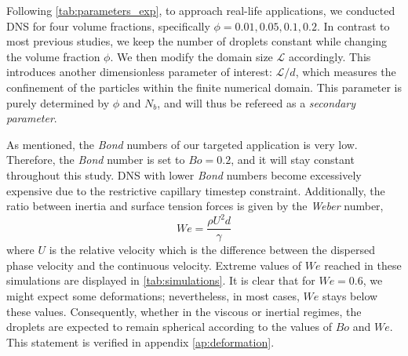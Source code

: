 Following \ref{tab:parameters_exp}, to approach real-life applications, we conducted DNS for four volume fractions, specifically $\phi = 0.01,0.05,0.1,0.2$.
In contrast to most previous studies, we keep the number of droplets constant while changing the volume fraction $\phi$. 
We then modify the domain size $\mathcal{L}$ accordingly. 
This introduces another dimensionless parameter of interest: $\mathcal{L}/d$, which measures the confinement of the particles within the finite numerical domain. 
This parameter is purely determined by $\phi$ and $N_b$, and will thus be refereed as a \textit{secondary parameter}.

As mentioned, the \textit{Bond} numbers of our targeted application is very low.
Therefore, the \textit{Bond} number is set to $Bo = 0.2$, and it will stay constant throughout this study.
DNS with lower \textit{Bond} numbers become excessively expensive due to the restrictive capillary timestep constraint. 
Additionally, the ratio between inertia and surface tension forces is given by the \textit{Weber} number, 
\begin{equation*}
    We = \frac{\rho U^2d}{\gamma}%
\end{equation*}
where $U$ is the relative velocity which is the difference between the dispersed phase velocity and the continuous velocity. %
Extreme values of $We$ reached in these simulations are displayed in \ref{tab:simulations}. 
It is clear that for $We=0.6$, we might expect some deformations; nevertheless, in most cases, $We$ stays below these values. 
Consequently, whether in the viscous or inertial regimes, the droplets are expected to remain spherical according to the values of $Bo$ and $We$.
This statement is verified in appendix \ref{ap:deformation}.%


